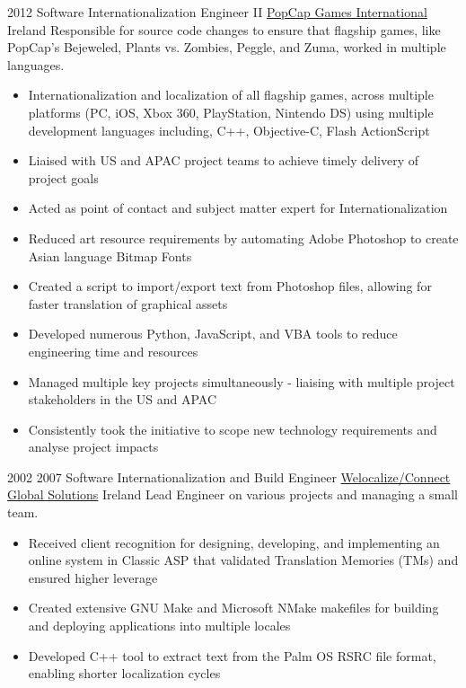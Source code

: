 
\begin{twenty}
  {2012}
  {Software Internationalization Engineer II}
  {\href{https://www.popcap.com/}{PopCap Games International}}
  {Ireland}
  {Responsible for source code changes to ensure that flagship games, like PopCap's Bejeweled, Plants vs. Zombies, Peggle, and Zuma, worked in multiple languages.}
  {\begin{itemize}
    \item Internationalization and localization of all flagship games, across multiple platforms (PC, iOS, Xbox 360, PlayStation, Nintendo DS) using multiple development languages including, C++, Objective-C, Flash ActionScript
    \item Liaised with US and APAC project teams to achieve timely delivery of project goals
    \item Acted as point of contact and subject matter expert for Internationalization
  \end{itemize}
  }
  {\begin{itemize}
    \item Reduced art resource requirements by automating Adobe Photoshop to create Asian language Bitmap Fonts
    \item Created a script to import/export text from Photoshop files, allowing for faster translation of graphical assets
    \item Developed numerous Python, JavaScript, and VBA tools to reduce engineering time and resources
    \item Managed multiple key projects simultaneously - liaising with multiple project stakeholders in the US and APAC
    \item Consistently took the initiative to scope new technology requirements and analyse project impacts
  \end{itemize}
  }
\end{twenty}

\vspace{0.25\baselineskip}
\begin{twenty}
\twentyitem
  {2002}
  {2007}
  {Software Internationalization and Build Engineer}
  {\href{https://www.welocalize.com/}{Welocalize/Connect Global Solutions}}
  {Ireland}
  {Lead Engineer on various projects and managing a small team.}
  {}
  {\begin{itemize}
    \item Received client recognition for designing, developing, and implementing an online system in Classic ASP that validated Translation Memories (TMs) and ensured higher leverage
    \item Created extensive GNU Make and Microsoft NMake makefiles for building and deploying applications into multiple locales
    \item Developed C++ tool to extract text from the Palm OS RSRC file format, enabling shorter localization cycles
  \end{itemize}
  }
\end{twenty}

